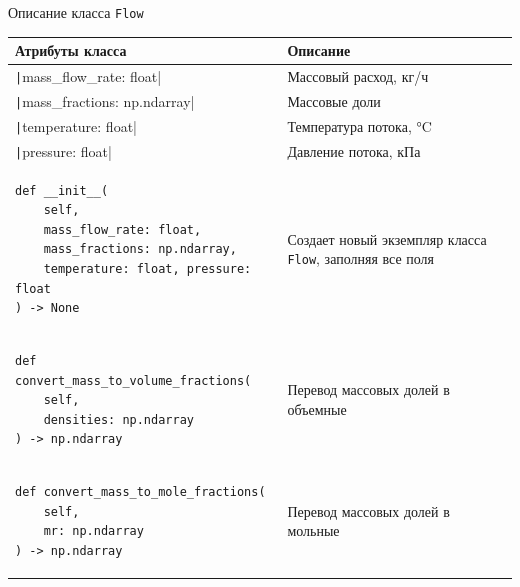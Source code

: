 \documentclass[aspectratio=169, mathserif]{beamer}	%
\begin{document}
\begin{frame}[fragile]{Описание класса \texttt{Flow}}
\scriptsize
\begin{table}[h!]
	\centering
	\renewcommand{\arraystretch}{1.2}
	\begin{tabular}{|p{.49\linewidth}|p{.49\linewidth}|}
		\hline
		\textbf{Атрибуты класса} & \textbf{Описание}  \\
		\hline
		\texttt|mass_flow_rate: float| & Массовый расход, кг/ч \\
		\hline
		\texttt|mass_fractions: np.ndarray| & Массовые доли \\
		\hline
		\texttt|temperature: float| & Температура потока, °C \\
		\hline
		\texttt|pressure: float| & Давление потока, кПа \\
		\hline
\begin{minipage}{\linewidth}
\begin{verbatim}
def __init__(
    self,
    mass_flow_rate: float,
    mass_fractions: np.ndarray,
    temperature: float, pressure: float
) -> None
\end{verbatim}
\end{minipage}
		& Создает новый экземпляр класса \texttt{Flow}, заполняя все поля \\
		\hline
\begin{minipage}{\linewidth}
\begin{verbatim}
def convert_mass_to_volume_fractions(
    self,
    densities: np.ndarray
) -> np.ndarray
\end{verbatim}
\end{minipage}
		& Перевод массовых долей в объемные \\
		\hline
\begin{minipage}{\linewidth}
\begin{verbatim}
def convert_mass_to_mole_fractions(
    self,
    mr: np.ndarray
) -> np.ndarray
\end{verbatim}
\end{minipage}
		& Перевод массовых долей в мольные \\
		\hline
	\end{tabular}
\end{table}
\vfill
\end{frame}
\end{document}
